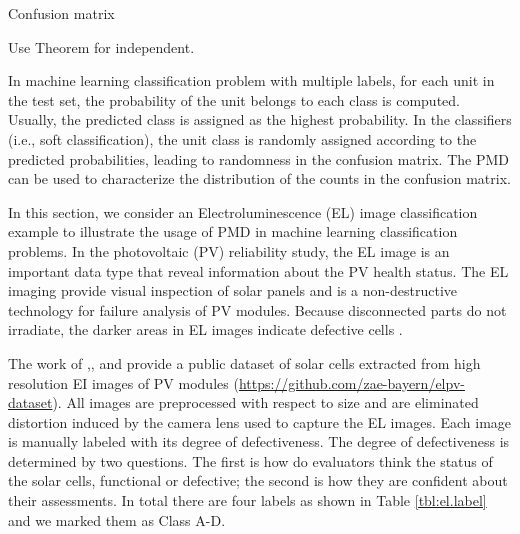 \documentclass[12pt]{article}
\begin{document}
Confusion matrix

Use Theorem for independent.

In machine learning classification problem with multiple labels, for each unit in the test set, the probability of the unit belongs to each class is computed. Usually, the predicted class is assigned as the highest probability. In the classifiers (i.e., soft classification), the unit class is randomly assigned according to the predicted probabilities, leading to randomness in the confusion matrix. The PMD can be used to characterize the distribution of the counts in the confusion matrix.


%

In this section, we consider an Electroluminescence (EL) image classification example to illustrate the usage of PMD in machine learning classification problems. In the photovoltaic (PV) reliability study, the EL image is an important data type that reveal information about the PV health status. The EL imaging provide visual inspection of solar panels and is a non-destructive technology for failure analysis of PV modules. Because disconnected parts do not irradiate, the darker areas in EL images indicate defective cells .

The work of ,, and  provide a public dataset of solar cells extracted from high resolution EI images of PV modules (\url{https://github.com/zae-bayern/elpv-dataset}). All images are preprocessed with respect to size and are eliminated distortion induced by the camera lens used to capture the EL images. Each image is manually labeled  with its degree of defectiveness. The degree of defectiveness is determined by two questions. The first is how do evaluators think the status of the solar cells, functional or defective; the second is how they are confident about their assessments. In total there are four labels as shown in Table \ref{tbl:el.label} and we marked them as Class A-D.
\end{document}
